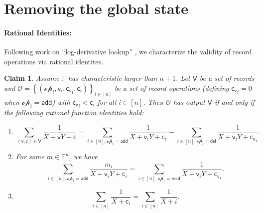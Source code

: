 \documentclass[11pt]{article} %
\newcommand{\F}{\ensuremath{\mathbb F}\xspace}
\newcommand{\sett}[2]{\ensuremath{\set{#1}_{#2}}\xspace}
\newcommand{\set}[1]{\ensuremath{\left\{#1\right\}}\xspace}
\newcommand{\sumi}[1]{\sum_{i\in[#1]}}
\newtheorem{claim}[lemma]{Claim}
\renewcommand{\c}{\ensuremath{\mathsf{c}}\xspace}
\newcommand{\vc}{\ensuremath{\mathsf{c_v}}\xspace}
\renewcommand{\v}{\ensuremath{\mathsf{v}}\xspace}
\newcommand{\add}{\ensuremath{\mathsf{add}}\xspace}
\newcommand{\del}{\ensuremath{\mathsf{del}}\xspace}
\renewcommand{\read}{\ensuremath{\mathsf{read}}\xspace}
\newcommand{\ops}{\ensuremath{\mathcal{O}}\xspace}
\newcommand{\op}{\ensuremath{\mathscr{op}}\xspace}
\newcommand{\recset}{\ensuremath{\mathsf{V}}\xspace}
\begin{document}
\section{Removing the global state}\label{sec:Fstar}

\paragraph{Rational Identities:}
Following work on ``log-derivative lookup'' \cite{bplusplus,logup}, we characterize the validity of record operations via rational identites.
\begin{claim}\label{clm:reducetologder}
Assume $\F$ has characteristic larger than $n+1$.
Let \recset be a set of records and $\ops=\sett{(\op_i,\v_i,\vc_i,\c_i)}{i\in [n]}$ be a set of record operations (defining $\vc_i=0$ when $\op_i=\add$) with $\vc_i<\c_i$ for all $i\in [n]$.
Then \ops has output \recset if and only if the following rational function identities hold:
\begin{enumerate}
 \item \[\sum_{(\v,\c)\in \recset}\frac{1}{X+\v Y+\c}=\sum_{i\in [n],\op_i=\add}\frac{1}{X+\v_i Y+\c_i}-\sum_{i\in [n], \op_i=\del}\frac{1}{X+\v_i Y+\vc_i}.\]
 \item For some $m\in \F^n$,
 we have
 \[\sum_{i\in [n],\op_i=\add}\frac{m_i}{X+\v_i Y+\c_i}=\sum_{i\in [n], \op_i=\read}\frac{1}{X+\v_i Y+\vc_i}.\]
 \item \[\sumi{n}\frac{1}{X+\c_i}=\sumi{n}\frac{1}{X+i}.\]
\end{enumerate}
\end{claim}
\end{document}
